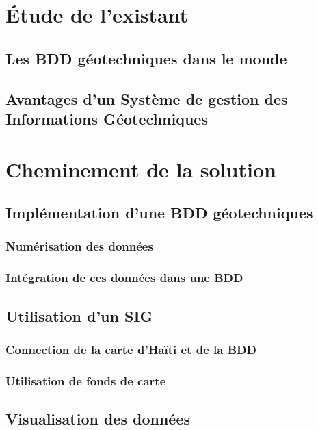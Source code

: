 \section{Étude de l'existant}
    \subsection{Les BDD géotechniques dans le monde}
        
    \subsection{Avantages d'un Système de gestion des Informations Géotechniques}
        

\section{Cheminement de la solution}
    \subsection{Implémentation d'une BDD géotechniques}
        \subsubsection{Numérisation des données}
            
        \subsubsection{Intégration de ces données dans une BDD}
            
    \subsection{Utilisation d'un SIG}
        \subsubsection{Connection de la carte d'Haïti et de la BDD}
            
        \subsubsection{Utilisation de fonds de carte}
            
    \subsection{Visualisation des données} 
